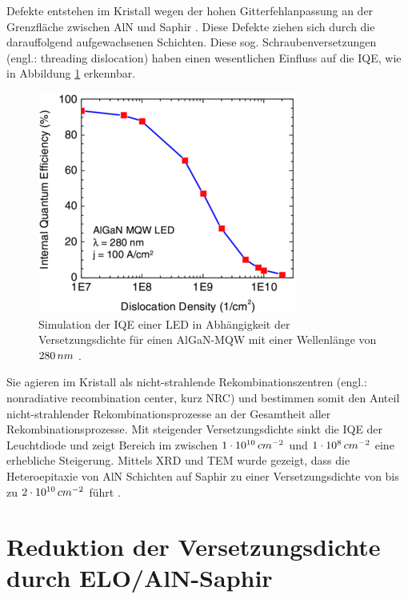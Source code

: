 Defekte entstehen im Kristall wegen der hohen Gitterfehlanpassung an der Grenzfläche zwischen AlN und Saphir \cite{pohl}. Diese Defekte ziehen sich durch die darauffolgend aufgewachsenen Schichten. Diese sog. Schraubenversetzungen (engl.: threading dislocation) haben einen wesentlichen Einfluss auf die IQE, wie in Abbildung \ref{fig:IQEthreadingdisl} erkennbar. 
%
\begin{figure}[h]
\centering
\begin{minipage}[t]{1\linewidth}
\centering
\includegraphics[width=0.5\linewidth]{Bilder/IQEthreadingdisl.PNG}
\end{minipage}%
\caption{Simulation der IQE einer LED in Abhängigkeit der Versetzungsdichte für einen AlGaN-MQW mit einer Wellenlänge von $280 \thinspace nm$ \cite{0268-1242-26-1-014036}.}
 \label{fig:IQEthreadingdisl}
\end{figure}
\noindent
Sie agieren im Kristall als nicht-strahlende Rekombinationszentren (engl.: nonradiative recombination center, kurz NRC) und bestimmen somit den Anteil nicht-strahlender Rekombinationsprozesse an der Gesamtheit aller Rekombinationsprozesse.
\newline
Mit steigender Versetzungsdichte sinkt die IQE der Leuchtdiode und zeigt Bereich im  zwischen $1\cdot 10^{10} \thinspace cm^{-2}$ und $1\cdot 10^8 \thinspace cm^{-2}$ eine erhebliche Steigerung. Mittels XRD und TEM wurde gezeigt, dass die Heteroepitaxie von AlN Schichten auf Saphir zu einer Versetzungsdichte von bis zu $2\cdot 10^{10} \thinspace cm^{-2}$ führt \cite{zeimeru}.

\section{Reduktion der Versetzungsdichte durch ELO/AlN-Saphir}

